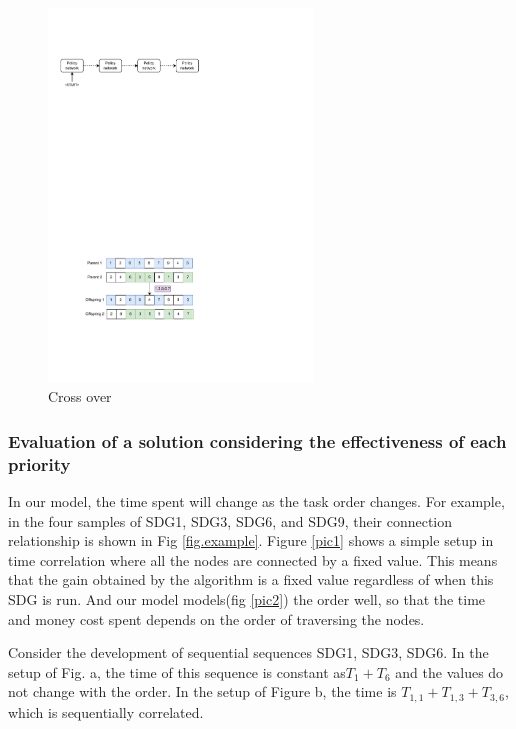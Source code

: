 \documentclass[10pt]{mcmthesis}
\begin{document}
\begin{figure}[H]
    \centering
    \includegraphics[width=7.0cm]{figures/cross_over.pdf}
    \caption{ Cross over }%
    \label{fig.cross}
\end{figure} 
\vspace{-15pt}

\subsubsection{ Evaluation of a solution considering the effectiveness of each priority}
In our model, the time spent will change as the task order changes. For example, in the four samples of SDG1, SDG3, SDG6, and SDG9, their connection relationship is shown in Fig \ref{fig.example}. 
Figure \ref{pic1} shows a simple setup in time correlation where all the nodes are connected by a fixed value. This means that the gain obtained by the algorithm is a fixed value regardless of when this SDG is run. And our model models(fig \ref{pic2}) the order well, so that the time and money cost spent depends on the order of traversing the nodes.

Consider the development of sequential sequences SDG1, SDG3, SDG6. In the setup of Fig. a, the time of this sequence is constant as$ T_1+T_6$ and the values do not change with the order. In the setup of Figure b, the time is $T_{1,1}+T_{1,3}+T_{3,6}$, which is sequentially correlated. 
\end{document}
